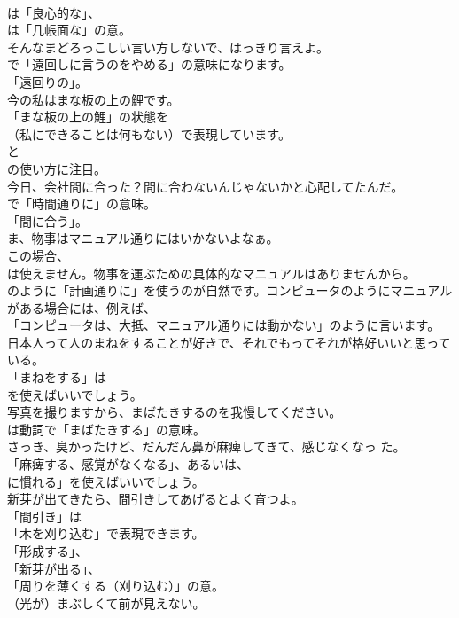 \documentclass[8pt]{extreport}
\begin{document}
\begin{CJK}{UTF8}{min}
\\	は「良心的な」、
\\	は「几帳面な」の意。	
\\	そんなまどろっこしい言い方しないで、はっきり言えよ。 
\\	で「遠回しに言うのをやめる」の意味になります。
\\	「遠回りの」。	
\\	今の私はまな板の上の鯉です。 
\\	「まな板の上の鯉」の状態を 
\\	（私にできることは何もない）で表現しています。
\\	と 
\\	の使い方に注目。	
\\	今日、会社間に合った？間に合わないんじゃないかと心配してたんだ。 
\\	で「時間通りに」の意味。
\\	「間に合う」。	
\\	ま、物事はマニュアル通りにはいかないよなぁ。 
\\	この場合、
\\	は使えません。物事を運ぶための具体的なマニュアルはありませんから。
\\	のように「計画通りに」を使うのが自然です。コンピュータのようにマニュアルがある場合には、例えば、
\\	「コンピュータは、大抵、マニュアル通りには動かない」のように言います。	
\\	日本人って人のまねをすることが好きで、それでもってそれが格好いいと思っている。 
\\	「まねをする」は
\\	を使えばいいでしょう。	
\\	写真を撮りますから、まばたきするのを我慢してください。 
\\	は動詞で「まばたきする」の意味。	
\\	さっき、臭かったけど、だんだん鼻が麻痺してきて、感じなくなっ た。 
\\	「麻痺する、感覚がなくなる」、あるいは、
\\	に慣れる」を使えばいいでしょう。	
\\	新芽が出てきたら、間引きしてあげるとよく育つよ。 
\\	「間引き」は
\\	「木を刈り込む」で表現できます。
\\	「形成する」、
\\	「新芽が出る」、
\\	「周りを薄くする（刈り込む）」の意。	
\\	（光が）まぶしくて前が見えない。 

\end{CJK}
\end{document}
